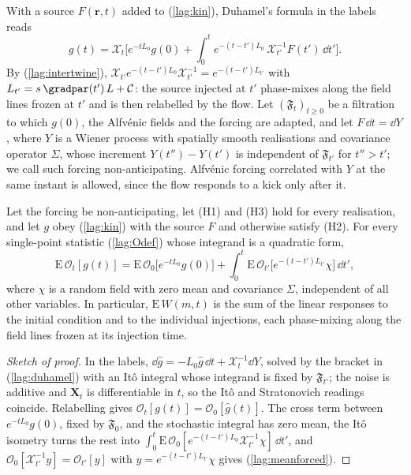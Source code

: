 With a source $F(\boldsymbol r,t)$ added to (\ref{lag:kin}), Duhamel's formula in the labels reads
\begin{equation}\label{lag:duhamel}
  g(t)=\mathcal X_t\Big[e^{-tL_0}g(0)+\int_0^te^{-(t-t')L_0}\,\mathcal X_{t'}^{-1}F(t')\,\dd t'\Big] .
\end{equation}
By (\ref{lag:intertwine}), $\mathcal X_{t'}e^{-(t-t')L_0}\mathcal X_{t'}^{-1}=e^{-(t-t')L_{t'}}$ with $L_{t'}=s\,\gradpar(t')\,L+\mathcal C$: the source injected at $t'$ phase-mixes along the field lines frozen at $t'$ and is then relabelled by the flow. Let $(\mathfrak F_t)_{t\ge0}$ be a filtration to which $g(0)$, the Alfv\'enic fields and the forcing are adapted, and let $F\,\dd t=\dd Y$, where $Y$ is a Wiener process with spatially smooth realisations and covariance operator $\Sigma$, whose increment $Y(t'')-Y(t')$ is independent of $\mathfrak F_{t'}$ for $t''>t'$; we call such forcing non-anticipating. Alfv\'enic forcing correlated with $Y$ at the same instant is allowed, since the flow responds to a kick only after it.

\begin{corollary}\label{cor:forcing}
Let the forcing be non-anticipating, let (H1) and (H3) hold for every realisation, and let $g$ obey (\ref{lag:kin}) with the source $F$ and otherwise satisfy (H2). For every single-point statistic (\ref{lag:Odef}) whose integrand is a quadratic form,
\begin{equation}\label{lag:meanforced}
  \mathrm E\,\mathcal O_t[g(t)]=\mathrm E\,\mathcal O_0\big[e^{-tL_0}g(0)\big]+\int_0^t\mathrm E\,\mathcal O_{t'}\big[e^{-(t-t')L_{t'}}\chi\big]\,\dd t' ,
\end{equation}
where $\chi$ is a random field with zero mean and covariance $\Sigma$, independent of all other variables. In particular, $\mathrm E\,W(m,t)$ is the sum of the linear responses to the initial condition and to the individual injections, each phase-mixing along the field lines frozen at its injection time.
\end{corollary}

\begin{proof}[Sketch of proof]
In the labels, $\dd\hat g=-L_0\hat g\,\dd t+\mathcal X_t^{-1}\dd Y$, solved by the bracket in (\ref{lag:duhamel}) with an It\^o integral whose integrand is fixed by $\mathfrak F_{t'}$; the noise is additive and $\boldsymbol X_t$ is differentiable in $t$, so the It\^o and Stratonovich readings coincide. Relabelling gives $\mathcal O_t[g(t)]=\mathcal O_0[\hat g(t)]$. The cross term between $e^{-tL_0}g(0)$, fixed by $\mathfrak F_0$, and the stochastic integral has zero mean, the It\^o isometry turns the rest into $\int_0^t\mathrm E\,\mathcal O_0[e^{-(t-t')L_0}\mathcal X_{t'}^{-1}\chi]\,\dd t'$, and $\mathcal O_0[\mathcal X_{t'}^{-1}y]=\mathcal O_{t'}[y]$ with $y=e^{-(t-t')L_{t'}}\chi$ gives (\ref{lag:meanforced}).
\end{proof}


